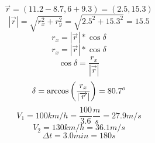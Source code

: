 	\begin{equation*}
		\overrightarrow{r}=(11.2-8.7,6+9.3)=(2.5,15.3)
	\end{equation*}
	\begin{equation*}
		|\overrightarrow{r}|=\sqrt{r^2_x+r^2_y}=\sqrt{2.5^2+15.3^2}=15.5
	\end{equation*}
	\begin{equation*}
		r_x=|\overrightarrow{r}|*\cos \delta
	\end{equation*}
	\begin{equation*}
		r_x=|\overrightarrow{r}|*\cos \delta
	\end{equation*}
	\begin{equation*}
		\cos \delta=\frac{r_x}{|\overrightarrow{r}|}
	\end{equation*}
	\begin{equation*}
		\delta=\arccos\left(\frac{r_x}{\lvert\overrightarrow{r}\rvert}\right)=80.7^o
	\end{equation*}
	\begin{equation*}
		V_1=100km/h=\frac{100}{3.6}\frac{m}{s}=27.9m/s
	\end{equation*}
	\begin{equation*}
		V_2=130km/h=36.1m/s
	\end{equation*}
	\begin{equation*}
		\Delta t=3.0min=180s
	\end{equation*}
